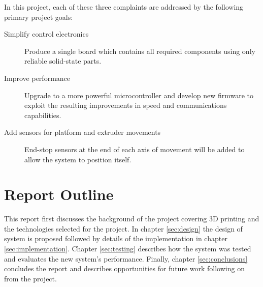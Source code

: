 		In this project, each of these three complaints are addressed by the
		following primary project goals:
		\begin{description}
			
			\item[Simplify control electronics] Produce a single board which contains
			all required components using only reliable solid-state parts.
			
			\item[Improve performance] Upgrade to a more powerful microcontroller and
			develop new firmware to exploit the resulting improvements in speed and
			communications capabilities.
			
			\item[Add sensors for platform and extruder movements] End-stop sensors at
			the end of each axis of movement will be added to allow the system to
			position itself.
			
		\end{description}
	
	\section{Report Outline}
		
		This report first discusses the background of the project covering 3D
		printing and the technologies selected for the project. In chapter
		\ref{sec:design} the design of system is proposed followed by details of the
		implementation in chapter \ref{sec:implementation}. Chapter
		\ref{sec:testing} describes how the system was tested and evaluates the new
		system's performance. Finally, chapter \ref{sec:conclusions} concludes the
		report and describes opportunities for future work following on from the
		project.

